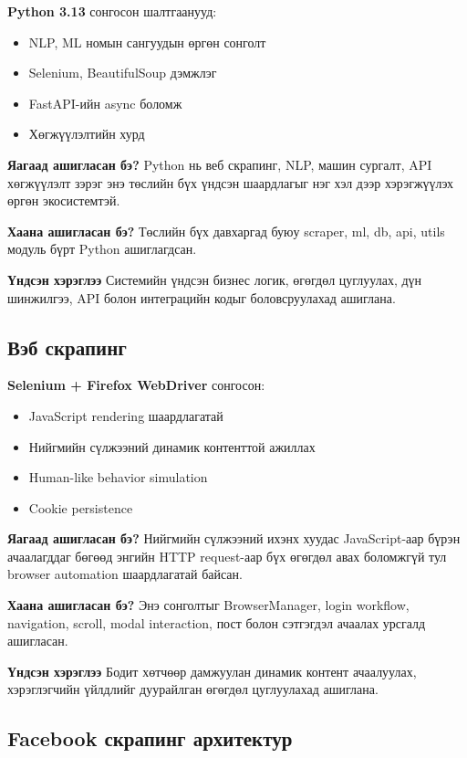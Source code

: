 \documentclass[12pt,a4paper]{report}
\begin{document}
\textbf{Python 3.13} сонгосон шалтгаанууд:
\begin{itemize}
    \item NLP, ML номын сангуудын өргөн сонголт
    \item Selenium, BeautifulSoup дэмжлэг
    \item FastAPI-ийн async боломж
    \item Хөгжүүлэлтийн хурд
\end{itemize}

\textbf{Яагаад ашигласан бэ?} Python нь веб скрапинг, NLP, машин сургалт, API хөгжүүлэлт зэрэг энэ төслийн бүх үндсэн шаардлагыг нэг хэл дээр хэрэгжүүлэх өргөн экосистемтэй.

\textbf{Хаана ашигласан бэ?} Төслийн бүх давхаргад буюу scraper, ml, db, api, utils модуль бүрт Python ашиглагдсан.

\textbf{Үндсэн хэрэглээ} Системийн үндсэн бизнес логик, өгөгдөл цуглуулах, дүн шинжилгээ, API болон интеграцийн кодыг боловсруулахад ашиглана.

\subsection{Вэб скрапинг}

\textbf{Selenium + Firefox WebDriver} сонгосон:
\begin{itemize}
    \item JavaScript rendering шаардлагатай
    \item Нийгмийн сүлжээний динамик контенттой ажиллах
    \item Human-like behavior simulation
    \item Cookie persistence
\end{itemize}

\textbf{Яагаад ашигласан бэ?} Нийгмийн сүлжээний ихэнх хуудас JavaScript-аар бүрэн ачаалагддаг бөгөөд энгийн HTTP request-аар бүх өгөгдөл авах боломжгүй тул browser automation шаардлагатай байсан.

\textbf{Хаана ашигласан бэ?} Энэ сонголтыг BrowserManager, login workflow, navigation, scroll, modal interaction, пост болон сэтгэгдэл ачаалах урсгалд ашигласан.

\textbf{Үндсэн хэрэглээ} Бодит хөтчөөр дамжуулан динамик контент ачаалуулах, хэрэглэгчийн үйлдлийг дуурайлган өгөгдөл цуглуулахад ашиглана.

\subsection{Facebook скрапинг архитектур}
\end{document}
